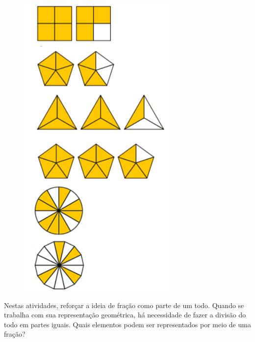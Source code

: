 {\begin{figure}
\includegraphics[width=0.7\textwidth]{./imgSAEB_6_MAT/media/image32.png}
\end{figure}

\begin{escolha}
\item {}
\item {}
\item {}
\item {}
\item {}
\item {}
\end{escolha}

\noindent Nestas atividades, reforçar a ideia de fração como parte de um todo.
Quando se trabalha com sua representação geométrica, há necessidade de
fazer a divisão do todo em partes iguais. Quais elementos podem ser representados por meio de uma fração?

}

